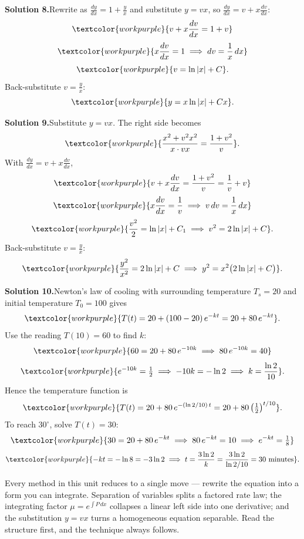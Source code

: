 \medskip
\noindent\textbf{Solution 8.}\quad Rewrite as $\frac{dy}{dx} = 1 + \frac{y}{x}$
and substitute $y = vx$, so $\frac{dy}{dx} = v + x\frac{dv}{dx}$:
\[ \textcolor{workpurple}{v + x\frac{dv}{dx} = 1 + v} \]
\[ \textcolor{workpurple}{x\frac{dv}{dx} = 1 \;\Longrightarrow\; dv = \frac{1}{x}\,dx} \]
\[ \textcolor{workpurple}{v = \ln|x| + C}. \]
Back-substitute $v = \frac{y}{x}$:
\[ \textcolor{workpurple}{y = x\ln|x| + Cx}. \]

\medskip
\noindent\textbf{Solution 9.}\quad Substitute $y = vx$. The right side becomes
\[ \textcolor{workpurple}{\frac{x^{2} + v^{2}x^{2}}{x\cdot vx} = \frac{1 + v^{2}}{v}}. \]
With $\frac{dy}{dx} = v + x\frac{dv}{dx}$,
\[ \textcolor{workpurple}{v + x\frac{dv}{dx} = \frac{1 + v^{2}}{v} = \frac{1}{v} + v} \]
\[ \textcolor{workpurple}{x\frac{dv}{dx} = \frac{1}{v} \;\Longrightarrow\; v\,dv = \frac{1}{x}\,dx} \]
\[ \textcolor{workpurple}{\frac{v^{2}}{2} = \ln|x| + C_{1} \;\Longrightarrow\; v^{2} = 2\ln|x| + C}. \]
Back-substitute $v = \frac{y}{x}$:
\[ \textcolor{workpurple}{\frac{y^{2}}{x^{2}} = 2\ln|x| + C \;\Longrightarrow\; y^{2} = x^{2}\big(2\ln|x| + C\big)}. \]

\medskip
\noindent\textbf{Solution 10.}\quad Newton's law of cooling with surrounding
temperature $T_{s} = 20$ and initial temperature $T_{0} = 100$ gives
\[ \textcolor{workpurple}{T(t) = 20 + (100 - 20)\,e^{-kt} = 20 + 80\,e^{-kt}}. \]
Use the reading $T(10) = 60$ to find $k$:
\[ \textcolor{workpurple}{60 = 20 + 80\,e^{-10k} \;\Longrightarrow\; 80\,e^{-10k} = 40} \]
\[ \textcolor{workpurple}{e^{-10k} = \tfrac{1}{2} \;\Longrightarrow\; -10k = -\ln 2 \;\Longrightarrow\; k = \frac{\ln 2}{10}}. \]
Hence the temperature function is
\[ \textcolor{workpurple}{T(t) = 20 + 80\,e^{-(\ln 2 / 10)\,t} = 20 + 80\left(\tfrac{1}{2}\right)^{t/10}}. \]
To reach $30^{\circ}$, solve $T(t) = 30$:
\[ \textcolor{workpurple}{30 = 20 + 80\,e^{-kt} \;\Longrightarrow\; 80\,e^{-kt} = 10 \;\Longrightarrow\; e^{-kt} = \tfrac{1}{8}} \]
\[ \textcolor{workpurple}{-kt = -\ln 8 = -3\ln 2 \;\Longrightarrow\; t = \frac{3\ln 2}{k} = \frac{3\ln 2}{\ln 2 / 10} = 30 \text{ minutes}}. \]

\vspace{0.8em}
\begin{conceptbox}
Every method in this unit reduces to a single move --- rewrite the equation
into a form you can integrate. \textcolor{accentorange}{Separation of variables}
splits a factored rate law; the \textcolor{accentorange}{integrating factor
$\mu = e^{\int P\,dx}$} collapses a linear left side into one derivative; and
the \textcolor{accentorange}{substitution $y = vx$} turns a homogeneous equation
separable. Read the structure first, and the technique always follows.
\end{conceptbox}


